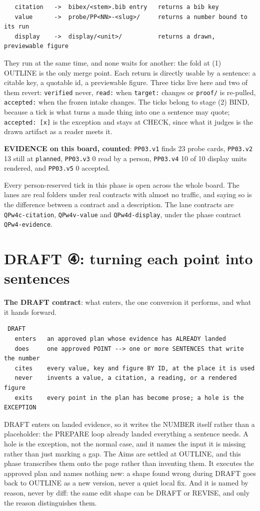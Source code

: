 \begin{verbatim}
   citation   ->  bibex/<stem>.bib entry   returns a bib key
   value      ->  probe/PP<NN>-<slug>/     returns a number bound to its run
   display    ->  display/<unit>/          returns a drawn, previewable figure
\end{verbatim}
They run at the same time, and none waits for another: the fold at (1) OUTLINE is the only merge point. Each return is directly usable by a sentence: a citable key, a quotable id, a previewable figure. Three ticks live here and two of them revert: \texttt{verified} never, \texttt{read:} when \texttt{target:} changes or \texttt{proof/} is re-pulled, \texttt{accepted:} when the frozen intake changes. The ticks belong to stage (2) BIND, because a tick is what turns a made thing into one a sentence may quote; \texttt{accepted: [x]} is the exception and stays at CHECK, since what it judges is the drawn artifact as a reader meets it.

\textbf{EVIDENCE on this board, counted}: \texttt{PP03.v1} finds 23 probe cards, \texttt{PP03.v2} 13 still at \texttt{planned}, \texttt{PP03.v3} 0 read by a person, \texttt{PP03.v4} 10 of 10 display units rendered, and \texttt{PP03.v5} 0 accepted.

Every person-reserved tick in this phase is open across the whole board. The lanes are real folders under real contracts with almost no traffic, and saying so is the difference between a contract and a description. The lane contracts are \texttt{QPw4c-citation}, \texttt{QPw4v-value} and \texttt{QPw4d-display}, under the phase contract \texttt{QPw4-evidence}.


\section{DRAFT ④: turning each point into sentences}
\textbf{The DRAFT contract}: what enters, the one conversion it performs, and what it hands forward.

\begin{verbatim}
 DRAFT
   enters   an approved plan whose evidence has ALREADY landed
   does     one approved POINT --> one or more SENTENCES that write the number
   cites    every value, key and figure BY ID, at the place it is used
   never    invents a value, a citation, a reading, or a rendered figure
   exits    every point in the plan has become prose; a hole is the EXCEPTION
\end{verbatim}
DRAFT enters on landed evidence, so it writes the NUMBER itself rather than a placeholder: the PREPARE loop already landed everything a sentence needs. A hole is the exception, not the normal case, and it names the input it is missing rather than just marking a gap. The Aims are settled at OUTLINE, and this phase transcribes them onto the page rather than inventing them. It executes the approved plan and names nothing new: a shape found wrong during DRAFT goes back to OUTLINE as a new version, never a quiet local fix. And it is named by reason, never by diff: the same edit shape can be DRAFT or REVISE, and only the reason distinguishes them.


